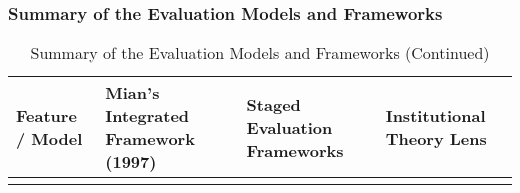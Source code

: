 \documentclass[../Main.tex]{subfiles}
\begin{document}
\subsubsection{Summary of the Evaluation Models and Frameworks}

\begin{longtable}{|p{}|p{}|p{}|p{}|}
    \caption{Summary of the Evaluation Models and Frameworks}
    \label{tab:evaluation-models-frameworks}                                                                                                                                                                                                                                                                                                                                                                                                                                                                                                                                                                                                                                                                                                                        \\
    \hline
    \textbf{Feature / Model}    & \textbf{Mian's Integrated Framework (1997)}                                                                                                             & \textbf{Staged Evaluation Frameworks}                                                                                                                             & \textbf{Institutional Theory Lens}                                                                                                   \\
    \hline
    \endfirsthead
    \caption[]{Summary of the Evaluation Models and Frameworks (Continued)}                                                                                                                                                                                                                                                                                                                                                                                                                                                                                                                                                                                                                                                                                         \\
    \hline

\end{longtable}
\end{document}
